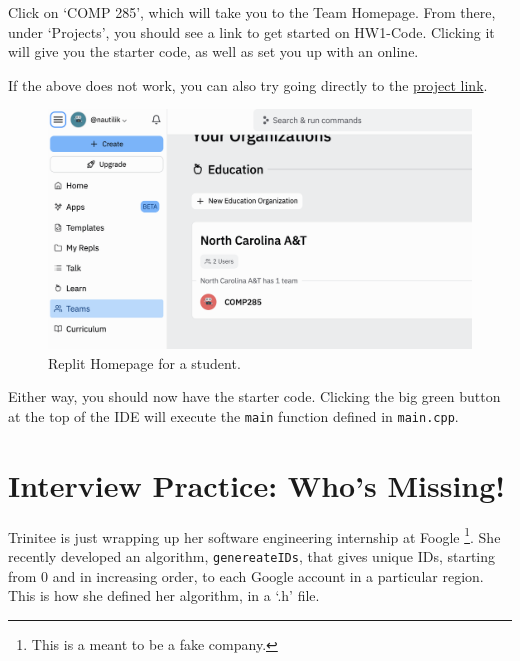 \documentclass [12pt]{article}
\begin{document}
Click on `COMP 285', which will take you to the Team Homepage. From there, under `Projects', you should see a link to get started on HW1-Code. Clicking it will give you the starter code, as well as set you up with an online. 

If the above does not work, you can also try going directly to the \href{https://replit.com/team/COMP285/HW1-Code}{project link}.

\begin{figure}[h!]
\centering
\includegraphics[scale=0.5]{replit}
\caption{Replit Homepage for a student.}
\label{fig:replit_homepage}
\end{figure}

Either way, you should now have the starter code. Clicking the big green button at the top of the IDE will execute the \texttt{main} function defined in \texttt{main.cpp}.




\pagebreak
\section{Interview Practice: Who's Missing!}

 Trinitee is just wrapping up her software engineering internship at Foogle \footnote{This is a meant to be a fake company.}. She recently developed an algorithm, \texttt{genereateIDs}, that gives unique IDs, starting from $0$ and in increasing order, to each Google account in a particular region. This is how she defined her algorithm, in a `.h' file.
\end{document}
